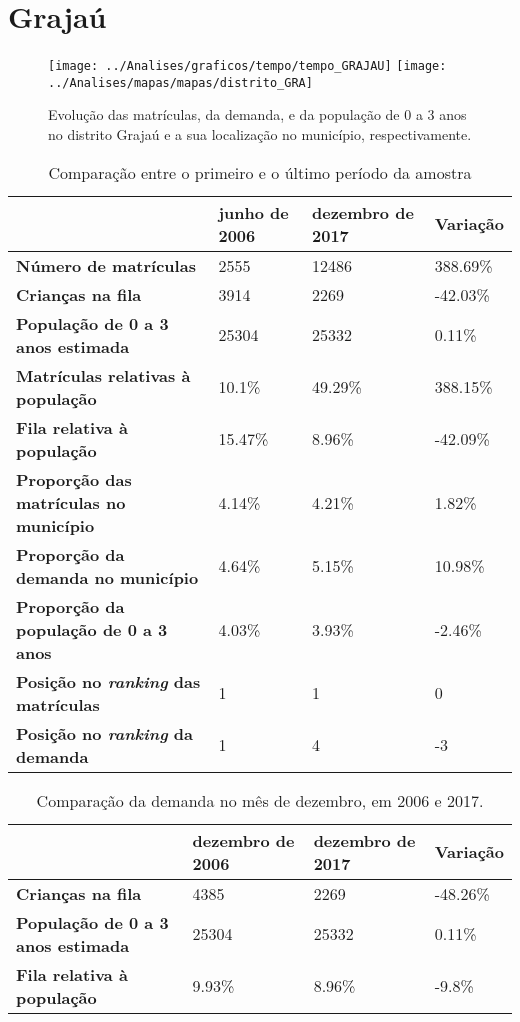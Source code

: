 \section{Grajaú}
\begin{figure}[H]
	\centering
	\texttt{[image: ../Analises/graficos/tempo/tempo\_GRAJAU]}
	\texttt{[image: ../Analises/mapas/mapas/distrito\_GRA]}
	\caption{Evolução das matrículas, da demanda, e da população de 0 a 3 anos no distrito Grajaú e a sua localização no município, respectivamente.}
\end{figure}
\begin{table}[H]
	\begin{tabular}{|l|l|l|l|}
		\hline
		\textbf{}                                      & \textbf{junho de 2006}       & \textbf{dezembro de 2017}    & \textbf{Variação} \\ \hline
		\textbf{Número de matrículas}                  & 2555 & 12486 & 388.69\% \\ \hline
		\textbf{Crianças na fila}                      & 3914 & 2269 & -42.03\% \\ \hline
		\textbf{População de 0 a 3 anos estimada}      & 25304 & 25332 & 0.11\% \\ \hline
		\textbf{Matrículas relativas à população}      & 10.1\% & 49.29\% & 388.15\% \\ \hline
		\textbf{Fila relativa à população}             & 15.47\% & 8.96\% & -42.09\% \\ \hline
		\textbf{Proporção das matrículas no município} & 4.14\% & 4.21\% & 1.82\% \\ \hline
		\textbf{Proporção da demanda no município}     & 4.64\% & 5.15\% & 10.98\% \\ \hline
		\textbf{Proporção da população de 0 a 3 anos}  & 4.03\% & 3.93\% & -2.46\% \\ \hline
		\textbf{Posição no \textit{ranking} das matrículas}     & 1 & 1 & 0 \\ \hline
		\textbf{Posição no \textit{ranking} da demanda}         & 1 & 4 & -3 \\ \hline
	\end{tabular}
	\caption{Comparação entre o primeiro e o último período da amostra}
\end{table}
\begin{table}[H]
	\begin{tabular}{|l|l|l|l|}
		\hline
		\textbf{}                                 & \textbf{dezembro de 2006} & \textbf{dezembro de 2017} & \textbf{Variação} \\ \hline
		\textbf{Crianças na fila}                      & 4385 & 2269 & -48.26\% \\ \hline
		\textbf{População de 0 a 3 anos estimada}      & 25304 & 25332 & 0.11\% \\ \hline
		\textbf{Fila relativa à população}             & 9.93\% & 8.96\% & -9.8\% \\ \hline
	\end{tabular}
	\caption{Comparação da demanda no mês de dezembro, em 2006 e 2017.}
\end{table}
